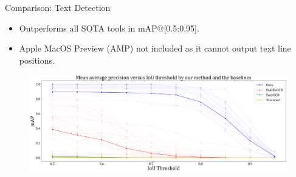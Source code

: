 \documentclass{beamer}
\begin{document}
\begin{frame}
    \begin{center}
        \Large{Comparison: Text Detection}
    \end{center}
    \begin{itemize}
        \item Outperforms all SOTA tools in mAP@[0.5:0.95].
        \item Apple MacOS Preview (AMP) not included as it cannot output text line positions.
    \end{itemize}
    \begin{figure}
        \centering
        \includegraphics[width=\textwidth]{figures/comp_map1.png}
    \end{figure}
\end{frame}
\end{document}

